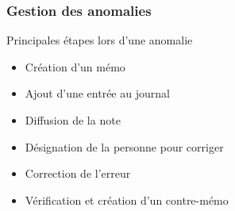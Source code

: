\begin{frame}
  \frametitle{\color{white} Gestion des anomalies}
  \begin{block}{Principales étapes lors d'une anomalie}
  \begin{itemize}
  \item Création d'un mémo
  \item Ajout d'une entrée au journal
  \item Diffusion de la note
  \item Désignation de la personne pour corriger
  \item Correction de l'erreur
  \item Vérification et création d'un contre-mémo
  \end{itemize}
  \end{block}
\end{frame}


